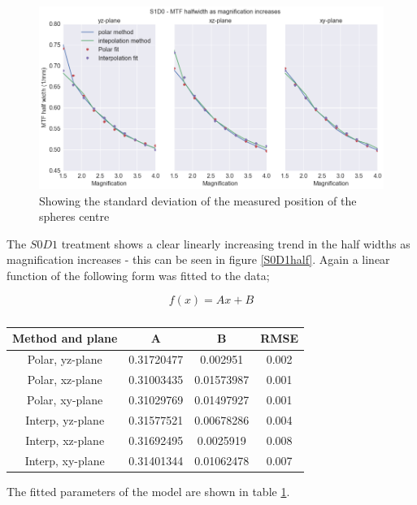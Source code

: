 \documentclass[
  twoside,
  11pt, a4paper,
  footinclude=true,
  headinclude=true,
  cleardoublepage=empty
]{scrbook}
\begin{document}
\begin{figure}[h!]
  \centering
    \includegraphics[width=\textwidth]{figures/S1D0mtf.png}
    \caption{Showing the standard deviation of the measured position of the spheres centre}
        \label{S1D0half}
\end{figure}

The $S0D1$ treatment shows a clear linearly increasing trend in the half widths as magnification increases - this can be seen in figure \ref{S0D1half}. Again a linear function of the following form was fitted to the data;

\[
f(x) = Ax + B
\]


\begin{table}
\caption{}
\label{linhalffit}
\begin{tabular}{c|ccc}
\toprule
{} Method and plane &     A &     B &  RMSE\\
\midrule
Polar, yz-plane         &  0.31720477 & 0.002951    & 0.002\\
Polar, xz-plane        &  0.31003435 & 0.01573987 &  0.001\\
Polar, xy-plane      &  0.31029769 & 0.01497927 &  0.001\\
Interp, yz-plane       &  0.31577521 & 0.00678286 &  0.004\\
Interp, xz-plane       &  0.31692495 & 0.0025919 &  0.008\\
Interp, xy-plane       &  0.31401344 & 0.01062478 &  0.007\\
\bottomrule
\end{tabular}
\end{table}

The fitted parameters of the model are shown in table \ref{linhalffit}.
\end{document}
